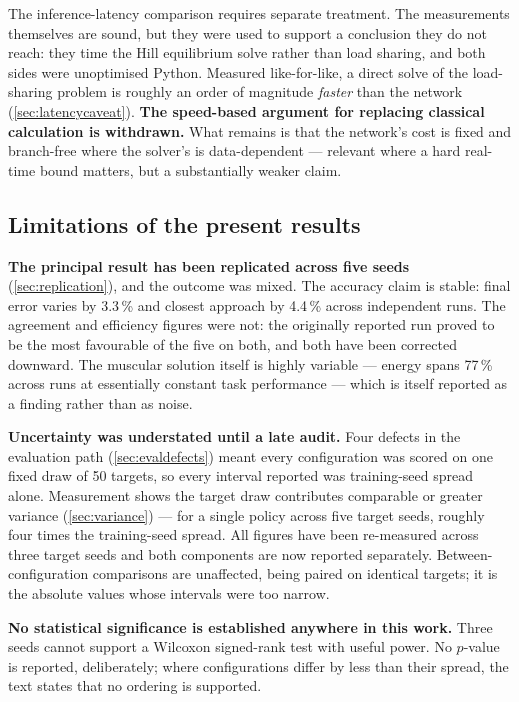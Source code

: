 The inference-latency comparison requires separate treatment. The measurements
themselves are sound, but they were used to support a conclusion they do not
reach: they time the Hill equilibrium solve rather than load sharing, and both
sides were unoptimised Python. Measured like-for-like, a direct solve of the
load-sharing problem is roughly an order of magnitude \emph{faster} than the
network (\cref{sec:latencycaveat}). \textbf{The speed-based argument for
replacing classical calculation is withdrawn.} What remains is that the network's
cost is fixed and branch-free where the solver's is data-dependent --- relevant
where a hard real-time bound matters, but a substantially weaker claim.

\subsection{Limitations of the present results}

\textbf{The principal result has been replicated across five seeds}
(\cref{sec:replication}), and the outcome was mixed. The accuracy claim is
stable: final error varies by 3.3\,\% and closest approach by 4.4\,\% across
independent runs. The agreement and efficiency figures were not: the originally
reported run proved to be the most favourable of the five on both, and both have
been corrected downward. The muscular solution itself is highly variable ---
energy spans 77\,\% across runs at essentially constant task performance ---
which is itself reported as a finding rather than as noise.

\textbf{Uncertainty was understated until a late audit.} Four defects in the
evaluation path (\cref{sec:evaldefects}) meant every configuration was scored on
one fixed draw of 50 targets, so every interval reported was training-seed spread
alone. Measurement shows the target draw contributes comparable or greater
variance (\cref{sec:variance}) --- for a single policy across five target seeds,
roughly four times the training-seed spread. All figures have been re-measured
across three target seeds and both components are now reported separately.
Between-configuration comparisons are unaffected, being paired on identical
targets; it is the absolute values whose intervals were too narrow.

\textbf{No statistical significance is established anywhere in this work.} Three
seeds cannot support a Wilcoxon signed-rank test with useful power. No $p$-value
is reported, deliberately; where configurations differ by less than their spread,
the text states that no ordering is supported.

